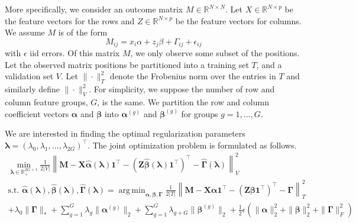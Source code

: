 \documentclass[12pt]{article}
\DeclareMathOperator*{\argmin}{arg\,min}
\begin{document}
More specifically, we consider an outcome matrix $M \in \mathbb{R}^{N\times N}$. Let $X\in \mathbb{R}^{N \times p}$ be the feature vectors for the rows and $Z \in \mathbb{R}^{N \times p}$ be the feature vectors for columns. We assume $M$ is of the form
\begin{equation}
M_{ij} = x_i \alpha + z_j \beta + \Gamma_{ij} + \epsilon_{ij}
\end{equation}
with $\epsilon$ iid errors. Of this matrix $M$, we only observe some subset of the positions. Let the observed matrix positions be partitioned into a training set $T$, and a validation set $V$. Let $\| \cdot \|^2_T$ denote the Frobenius norm over the entries in $T$ and similarly define $\| \cdot \|^2_V$. For simplicity, we suppose the number of row and column feature groups, $G$, is the same. We partition the row and column coefficient vectors $\boldsymbol{\alpha}$ and $\boldsymbol{\beta}$ into $\boldsymbol{\alpha}^{(g)}$ and $\boldsymbol{\beta}^{(g)}$ for groups $g=1,...,G$. 

We are interested in finding the optimal regularization parameters $\boldsymbol{\lambda} = (\lambda_0, \lambda_1, ...,  \lambda_{2G})^\top$. The joint optimization problem is formulated as follows.
\begin{equation}
	\begin{array}{c}
		\min_{\boldsymbol{\lambda} \in \mathbb{R}^{2G+1}_{+}} \frac{1}{2|V|}
		\left \| 
		\boldsymbol{M} 
		- \boldsymbol{X} \hat{\boldsymbol{\alpha}}(\boldsymbol{\lambda})  \boldsymbol{1}^\top 
		- (\boldsymbol{Z} \hat{\boldsymbol{\beta}}(\boldsymbol{\lambda})  \boldsymbol{1}^\top )^\top
		- \hat{\boldsymbol{\Gamma}}(\boldsymbol{\lambda})
		\right \|^2_V \\
		\text{s.t. }
		\hat{\boldsymbol{\alpha}}(\boldsymbol{\lambda}),
		\hat{\boldsymbol{\beta}}(\boldsymbol{\lambda}),
		\hat{\boldsymbol{\Gamma}}(\boldsymbol{\lambda})
		 =
		\argmin_{\boldsymbol{\alpha}, \boldsymbol{\beta}, \boldsymbol{\Gamma}} 
		\frac{1}{2|T|} 
		\left \| 
		\boldsymbol{M} 
		- \boldsymbol{X} \boldsymbol{\alpha} \boldsymbol{1}^\top 
		- (\boldsymbol{Z} \boldsymbol{\beta} \boldsymbol{1}^\top )^\top
		- \boldsymbol{\Gamma}
		\right \|^2_T \\
		+ \lambda_0 \| \boldsymbol\Gamma \|_*
		+ \sum_{g=1}^G \lambda_g \| \boldsymbol\alpha^{(g)} \|_2
		+ \sum_{g=1}^G  \lambda_{g+G} \| \boldsymbol\beta^{(g)} \|_2
		+ \frac{1}{2} \epsilon \left (
		\| \boldsymbol\alpha \|_2^2 + \| \boldsymbol\beta \|_2^2
		+ \| \boldsymbol{\Gamma}\|^2_F
		\right )
	\end{array}
	\label{eq:matrix_comp_groups}
\end{equation}
\end{document}
